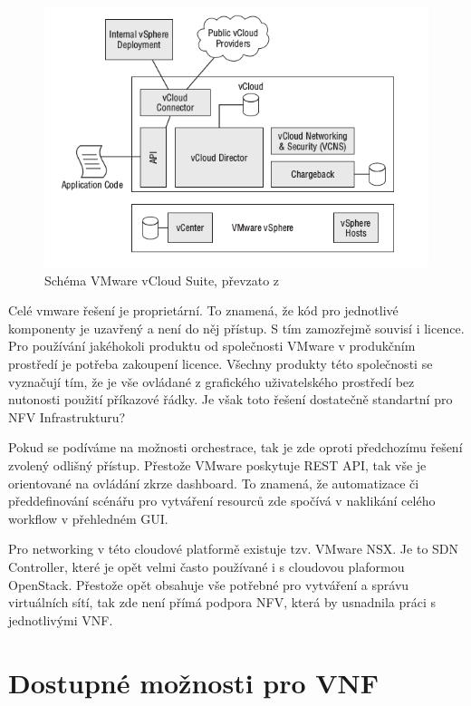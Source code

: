 \begin{figure}[h]
\begin{centering}
\includegraphics[scale=0.75]{images/vmware}
\par\end{centering}
\caption{Schéma VMware vCloud Suite, převzato z \cite{vmware_obrazek}\label{fig:vmware}}
\end{figure}

Celé vmware řešení je proprietární. To znamená, že kód pro jednotlivé komponenty je uzavřený a není do něj přístup. S tím zamozřejmě souvisí i licence. Pro používání jakéhokoli produktu od společnosti VMware v produkčním prostředí je potřeba zakoupení licence. Všechny produkty této společnosti se vyznačují tím, že je vše ovládané z grafického uživatelského prostředí bez nutonosti použití příkazové řádky. Je však toto řešení dostatečně standartní pro NFV Infrastrukturu?

Pokud se podíváme na možnosti orchestrace, tak je zde oproti předchozímu řešení zvolený odlišný přístup. Přestože VMware poskytuje REST API, tak vše je orientované na ovládání zkrze dashboard. To znamená, že automatizace či předdefinování scénářu pro vytváření resourců zde spočívá v naklikání celého workflow v přehledném GUI.

Pro networking v této cloudové platformě existuje tzv. VMware NSX. Je to SDN Controller, které je opět velmi často používané i s cloudovou plaformou OpenStack. Přestože opět obsahuje vše potřebné pro vytváření a správu virtuálních sítí, tak zde není přímá podpora NFV, která by usnadnila práci s jednotlivými VNF.


\section{Dostupné možnosti pro VNF} \label{sec:VNF}

